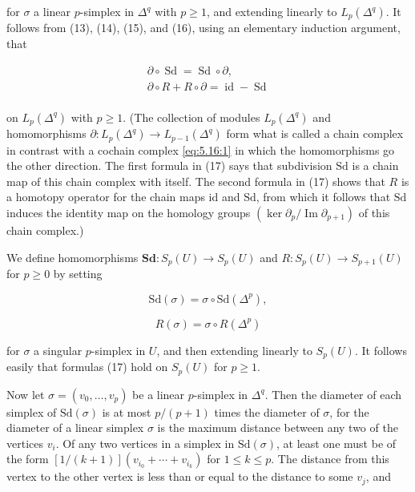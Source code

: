 for $\sigma$ a linear $p$-simplex in $\Delta^{q}$ with $p \geq 1$, and extending linearly to $L_{p}(\Delta^{q})$. It follows from (13), (14), (15), and (16), using an elementary induction argument, that

\begin{equation}
\tag{17}\label{eq:5.32:17}
\begin{aligned}{\partial\circ\operatorname{Sd}=\operatorname{Sd}\circ\partial,}\\ {\partial\circ R+R\circ\partial=\operatorname{id}-\operatorname{Sd}}\\ \end{aligned}
\end{equation}

on $L_{p}(\Delta^{q})$ with $p\geq1$. (The collection of modules $L_{p}(\Delta^{q})$ and homomorphisms $\partial\colon L_{p}(\Delta^{q})\to L_{p-1}(\Delta^{q})$ form what is called a chain complex in contrast with a cochain complex \eqref{eq:5.16:1} in which the homomorphisms go the other direction. The first formula in (17) says that subdivision $\mathrm{Sd}$ is a chain map of this chain complex with itself. The second formula in (17) shows that $R$ is a homotopy operator for the chain maps id and $\mathrm{Sd}$, from which it follows that $\mathrm{Sd}$ induces the identity map on the homology groups $(\ker\partial_{p}/\operatorname{Im}\partial_{p+1})$ of this chain complex.) 

We define homomorphisms $\mathbf{Sd}\colon S_p(U)\to S_p(U)$ and $R\colon S_p(U)\to S_{p+1}(U)$ for $p\geq0$ by setting

\begin{equation}
\tag{18}\label{eq:5.32:18}
\mathrm{Sd}(\sigma)=\sigma\circ\mathrm{Sd}(\Delta^{p}),
\end{equation}

\[
R(\sigma)=\sigma\circ R(\Delta^{p})
\]

for $\sigma$ a singular $p$-simplex in $U$, and then extending linearly to $S_{p}(U)$. It follows easily that formulas (17) hold on $S_{p}(U)$ for $p \geq 1$.

Now let  $ \sigma = (v_0, \ldots, v_p) $ be a linear  $ p $-simplex in  $ \Delta^q $. Then the diameter of each simplex of  $ \mathrm{Sd}(\sigma) $ is at most  $ p/(p+1) $ times the diameter of  $ \sigma $, for the diameter of a linear simplex  $ \sigma $ is the maximum distance between any two of the vertices  $ v_i $. Of any two vertices in a simplex in  $ \mathrm{Sd}(\sigma) $, at least one must be of the form  $ [1/(k+1)](v_{i_0} + \cdots + v_{i_k}) $ for  $ 1 \leq k \leq p $. The distance from this vertex to the other vertex is less than or equal to the distance to some  $ v_j $, and

